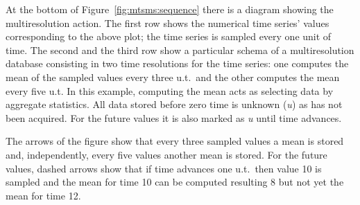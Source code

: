 At the bottom of Figure~\ref{fig:mtsms:sequence} there is a diagram
showing the multiresolution action. The first row shows the numerical
time series' values corresponding to the above plot; the time series
is sampled every one unit of time. The second and the third row show a
particular schema of a multiresolution database consisting in two time
resolutions for the time series: one computes the mean of the sampled
values every three u.t.\ and the other computes the mean every five
u.t. In this example, computing the mean acts as selecting data
by aggregate statistics. All data stored before zero time is unknown
(\emph{u}) as has not been acquired. For the future values it is also
marked as \emph{u} until time advances.

The arrows of the figure show that every three sampled values a mean
is stored and, independently, every five values another mean is
stored. For the future values, dashed arrows show that if time
advances one u.t.\ then value 10 is sampled and the mean for time 10
can be computed resulting 8 but not yet the mean for time 12.






